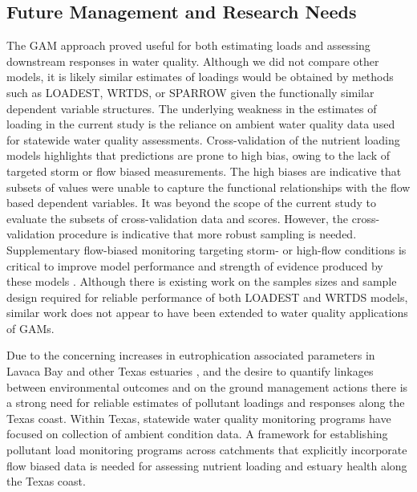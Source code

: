 \documentclass[fleqn,10pt,lineno]{wlpeerj} %
\begin{document}
\hypertarget{future-management-and-research-needs}{%
\subsection*{Future Management and Research
Needs}\label{future-management-and-research-needs}}

The GAM approach proved useful for both estimating loads and assessing
downstream responses in water quality. Although we did not compare other
models, it is likely similar estimates of loadings would be obtained by
methods such as LOADEST, WRTDS, or SPARROW given the functionally
similar dependent variable structures. The underlying weakness in the
estimates of loading in the current study is the reliance on ambient
water quality data used for statewide water quality assessments.
Cross-validation of the nutrient loading models highlights that
predictions are prone to high bias, owing to the lack of targeted storm
or flow biased measurements. The high biases are indicative that subsets
of values were unable to capture the functional relationships with the
flow based dependent variables. It was beyond the scope of the current
study to evaluate the subsets of cross-validation data and scores.
However, the cross-validation procedure is indicative that more robust
sampling is needed. Supplementary flow-biased monitoring targeting
storm- or high-flow conditions is critical to improve model performance
and strength of evidence produced by these models
\autocite{horowitzEvaluationSedimentRating2003,snelderEstimationCatchmentNutrient2017}.
Although there is existing work on the samples sizes and sample design
required for reliable performance of both LOADEST
\autocite{parkUsePollutantLoad2014} and WRTDS
\autocite{kumarValueIntensiveSampling2019} models, similar work does not
appear to have been extended to water quality applications of GAMs.

Due to the concerning increases in eutrophication associated parameters
in Lavaca Bay and other Texas estuaries \autocite{bugica_water_2020},
and the desire to quantify linkages between environmental outcomes and
on the ground management actions \autocite{schrammTotalMaximumDaily2022}
there is a strong need for reliable estimates of pollutant loadings and
responses along the Texas coast. Within Texas, statewide water quality
monitoring programs have focused on collection of ambient condition
data. A framework for establishing pollutant load monitoring programs
across catchments that explicitly incorporate flow biased data is needed
for assessing nutrient loading and estuary health along the Texas coast.
\end{document}
